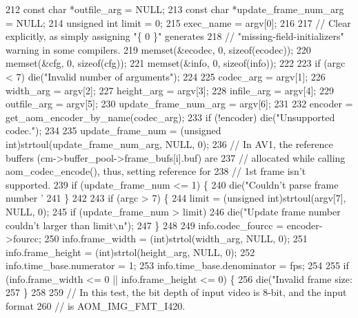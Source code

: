 \begin{DoxyCodeInclude}
{{{{{212   \textcolor{keyword}{const} \textcolor{keywordtype}{char} *outfile\_arg = NULL;
213   \textcolor{keyword}{const} \textcolor{keywordtype}{char} *update\_frame\_num\_arg = NULL;
214   \textcolor{keywordtype}{unsigned} \textcolor{keywordtype}{int} limit = 0;
215   exec\_name = argv[0];
216 
217   \textcolor{comment}{// Clear explicitly, as simply assigning "\{ 0 \}" generates}
218   \textcolor{comment}{// "missing-field-initializers" warning in some compilers.}
219   memset(&ecodec, 0, \textcolor{keyword}{sizeof}(ecodec));
220   memset(&cfg, 0, \textcolor{keyword}{sizeof}(cfg));
221   memset(&info, 0, \textcolor{keyword}{sizeof}(info));
222 
223   \textcolor{keywordflow}{if} (argc < 7) die(\textcolor{stringliteral}{"Invalid number of arguments"});
224 
225   codec\_arg = argv[1];
226   width\_arg = argv[2];
227   height\_arg = argv[3];
228   infile\_arg = argv[4];
229   outfile\_arg = argv[5];
230   update\_frame\_num\_arg = argv[6];
231 
232   encoder = get\_aom\_encoder\_by\_name(codec\_arg);
233   \textcolor{keywordflow}{if} (!encoder) die(\textcolor{stringliteral}{"Unsupported codec."});
234 
235   update\_frame\_num = (\textcolor{keywordtype}{unsigned} int)strtoul(update\_frame\_num\_arg, NULL, 0);
236   \textcolor{comment}{// In AV1, the reference buffers (cm->buffer\_pool->frame\_bufs[i].buf) are}
237   \textcolor{comment}{// allocated while calling aom\_codec\_encode(), thus, setting reference for}
238   \textcolor{comment}{// 1st frame isn't supported.}
239   \textcolor{keywordflow}{if} (update\_frame\_num <= 1) \{
240     die(\textcolor{stringliteral}{"Couldn't parse frame number '%
241   \}
242 
243   \textcolor{keywordflow}{if} (argc > 7) \{
244     limit = (\textcolor{keywordtype}{unsigned} int)strtoul(argv[7], NULL, 0);
245     \textcolor{keywordflow}{if} (update\_frame\_num > limit)
246       die(\textcolor{stringliteral}{"Update frame number couldn't larger than limit\(\backslash\)n"});
247   \}
248 
249   info.codec\_fourcc = encoder->fourcc;
250   info.frame\_width = (int)strtol(width\_arg, NULL, 0);
251   info.frame\_height = (int)strtol(height\_arg, NULL, 0);
252   info.time\_base.numerator = 1;
253   info.time\_base.denominator = fps;
254 
255   \textcolor{keywordflow}{if} (info.frame\_width <= 0 || info.frame\_height <= 0) \{
256     die(\textcolor{stringliteral}{"Invalid frame size: %
257   \}
258 
259   \textcolor{comment}{// In this test, the bit depth of input video is 8-bit, and the input format}
260   \textcolor{comment}{// is AOM\_IMG\_FMT\_I420.}
}}}}}}}
\end{DoxyCodeInclude}
